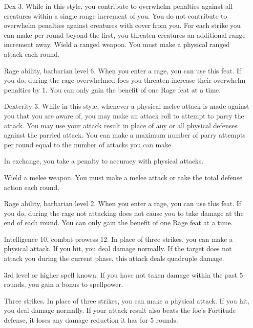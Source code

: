\featpre Dex 3.
\featben While in this style, you contribute to overwhelm penalties against all creatures within a single range increment of you.
You do not contribute to overwhelm penalties against creatures with cover from you.
For each strike you can make per round beyond the first, you threaten creatures an additional range increment away.
\stylereq Wield a ranged weapon.
You must make a physical ranged attack each round.

\featpre Rage ability, barbarian level 6.
\featben When you enter a rage, you can use this feat. If you do, during the rage overwhelmed foes you threaten increase their overwhelm penalties by 1.
 You can only gain the benefit of one Rage feat at a time.

\featpre Dexterity 3.
\featben While in this style, whenever a physical melee attack is made against you that you are aware of, you may make an attack roll to attempt to parry the attack.
You may use your attack result in place of any or all physical defenses against the parried attack.
You can make a maximum number of parry attempts per round equal to the number of attacks you can make.

In exchange, you take a  penalty to accuracy with physical attacks.

\stylereq Wield a melee weapon.
You must make a melee attack or take the total defense action each round.

\featpre Rage ability, barbarian level 2.
\featben When you enter a rage, you can use this feat. If you do, during the rage not attacking does not cause you to take damage at the end of each round.
 You can only gain the benefit of one Rage feat at a time.

\featpre Intelligence 10, combat prowess 12.
\featben In place of three strikes, you can make a physical attack.
If you hit, you deal damage normally.
If the target does not attack you during the current phase, this attack deals quadruple damage.

\featpre 3rd level or higher  spell known.
\featben If you have not taken damage within the past 5 rounds, you gain a  bonus to spellpower.

\featpre Three strikes.
\featben In place of three strikes, you can make a physical attack.
If you hit, you deal damage normally.
If your attack result also beats the foe's Fortitude defense, it loses any damage reduction it has for 5 rounds.


